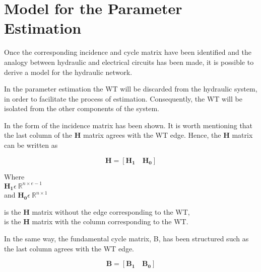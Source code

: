 \section{Model for the Parameter Estimation}  
\label{ParameterEstimation}
Once the corresponding incidence and cycle matrix have been identified and the analogy between hydraulic and
electrical circuits has been made, it is possible to derive a model for the hydraulic network. 

In the parameter estimation the WT will be discarded from the hydraulic system, 
in order to facilitate the process of estimation. Consequently, the WT will be isolated from the other components of the
system.  



In  the form of the incidence matrix has been shown. It is worth mentioning that the last column of the $\pmb{H}$ matrix agrees with the WT edge. Hence, the $\pmb{H}$ matrix can be written as 

\begin {equation}
\pmb{H} = [\pmb{H_1} \quad \pmb{H_0}]
\label{Hmatrix}
\end{equation}

\begin{minipage}[t]{0.18\textwidth}
Where\\
\hspace*{8mm} $\pmb{H_1} \epsilon \: \mathbb{R}^{n \times e-1}$  \\
and \hspace*{0.4mm} $\pmb{H_0} \epsilon \: \mathbb{R}^{n \times 1} $ 
\end{minipage}
\begin{minipage}[t]{0.70\textwidth}
\vspace*{2mm}
\hspace*{4mm} is the $\pmb{H}$ matrix without the edge corresponding to the WT,\\
\hspace*{4mm} is the $\pmb{H}$ matrix with the column corresponding to the WT. 
\end{minipage}

In the same way, the fundamental cycle matrix, B, has been structured such as the last column agrees with the WT edge.

\begin{equation}
  \pmb{B} = [\pmb{B_1} \quad \pmb{B_0}]
\end{equation} 

